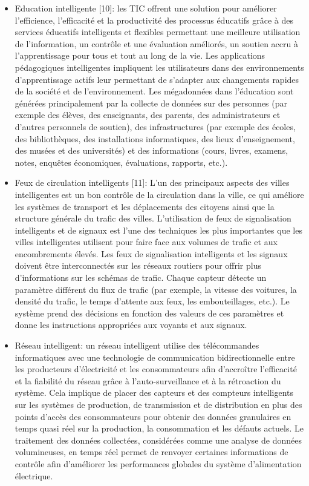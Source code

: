 \documentclass[french, a4paper, 12pt]{report}
\begin{document}
\begin{itemize}
\item \textbf{}Education intelligente [10]: les TIC offrent une solution pour améliorer l'efficience, l'efficacité et la productivité des processus éducatifs grâce à des services éducatifs intelligents et flexibles permettant une meilleure utilisation de l'information, un contrôle et une évaluation améliorés, un soutien accru à l'apprentissage pour tous et tout au long de la vie. Les applications pédagogiques intelligentes impliquent les utilisateurs dans des environnements d’apprentissage actifs leur permettant de s’adapter aux changements rapides de la société et de l’environnement. Les mégadonnées dans l'éducation sont générées principalement par la collecte de données sur des personnes (par exemple des élèves, des enseignants, des parents, des administrateurs et d'autres personnels de soutien), des infrastructures (par exemple des écoles, des bibliothèques, des installations informatiques, des lieux d'enseignement, des musées et des universités) et des informations (cours, livres, examens, notes, enquêtes économiques, évaluations, rapports, etc.). 
\item \textbf{}Feux de circulation intelligents [11]: L’un des principaux aspects des villes intelligentes est un bon contrôle de la circulation dans la ville, ce qui améliore les systèmes de transport et les déplacements des citoyens ainsi que la structure générale du trafic des villes. L'utilisation de feux de signalisation intelligents et de signaux est l'une des techniques les plus importantes que les villes intelligentes utilisent pour faire face aux volumes de trafic et aux encombrements élevés. Les feux de signalisation intelligents et les signaux doivent être interconnectés sur les réseaux routiers pour offrir plus d'informations sur les schémas de trafic. Chaque capteur détecte un paramètre différent du flux de trafic (par exemple, la vitesse des voitures, la densité du trafic, le temps d'attente aux feux, les embouteillages, etc.). Le système prend des décisions en fonction des valeurs de ces paramètres et donne les instructions appropriées aux voyants et aux signaux. 
\item \textbf{}Réseau intelligent: un réseau intelligent utilise des télécommandes informatiques avec une technologie de communication bidirectionnelle entre les producteurs d'électricité et les consommateurs afin d'accroître l'efficacité et la fiabilité du réseau grâce à l'auto-surveillance et à la rétroaction du système. Cela implique de placer des capteurs et des compteurs intelligents sur les systèmes de production, de transmission et de distribution en plus des points d'accès des consommateurs pour obtenir des données granulaires en temps quasi réel sur la production, la consommation et les défauts actuels. Le traitement des données collectées, considérées comme une analyse de données volumineuses, en temps réel permet de renvoyer certaines informations de contrôle afin d'améliorer les performances globales du système d'alimentation électrique.

\end{itemize}
\end{document}
